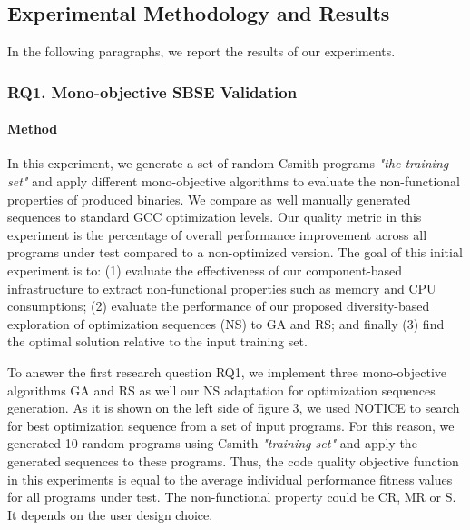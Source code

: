 \subsection{Experimental Methodology and Results}
In the following paragraphs, we report the results of our experiments.

\subsubsection{RQ1. Mono-objective SBSE Validation}
\paragraph{Method}
In this experiment, we generate a set of random Csmith programs \textit{"the training set"} and apply different mono-objective algorithms to evaluate the non-functional properties of produced binaries. We compare as well manually generated sequences to standard GCC optimization levels. Our quality metric in this experiment is the percentage of overall performance improvement across all programs under test compared to a non-optimized version. The goal of this initial experiment is to: (1) evaluate the effectiveness of our component-based infrastructure to extract non-functional properties such as memory and CPU consumptions; (2) evaluate the performance of our proposed diversity-based exploration of optimization sequences (NS) to GA and RS; and finally (3) find the optimal solution relative to the input training set.




To answer the first research question RQ1, we implement three mono-objective algorithms GA and RS as well our NS adaptation for optimization sequences generation. As it is shown on the left side of figure 3, we used NOTICE to search for best optimization sequence from a set of input programs. For this reason, we generated 10 random programs using Csmith \textit{"training set"} and apply the generated sequences to these programs. Thus, the code quality objective function in this
experiments is equal to the average individual performance fitness values for all programs under test. The non-functional property could be CR, MR or S. It depends on the user design choice.
